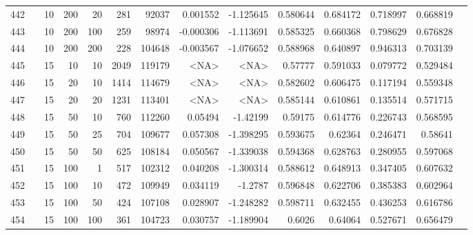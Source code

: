 \begin{longtable}{llrrrrrrrrrrrr}
		442 & &           10 &               200 &           20 &          281 &      92037 &  0.001552 & -1.125645 &  0.580644 &    0.684172 &       0.718997 &  0.668819 \\
		443 & &           10 &               200 &          100 &          259 &      98974 & -0.000306 & -1.113691 &  0.585325 &    0.660368 &       0.798629 &  0.676828 \\
		444 & &           10 &               200 &          200 &          228 &     104648 & -0.003567 & -1.076652 &  0.588968 &    0.640897 &       0.946313 &  0.703139 \\
		445 & &           15 &                10 &           10 &           2049 &     119179 &      <NA> &      <NA> &   0.57777 &    0.591033 &       0.079772 &  0.529484 \\
		446 & &           15 &                20 &           10 &           1414 &     114679 &      <NA> &      <NA> &  0.582602 &    0.606475 &       0.117194 &  0.559348 \\
		447 & &           15 &                20 &           20 &           1231 &     113401 &      <NA> &      <NA> &  0.585144 &    0.610861 &       0.135514 &  0.571715 \\
		448 & &           15 &                50 &           10 &          760 &     112260 &   0.05494 &  -1.42199 &   0.59175 &    0.614776 &       0.226743 &  0.568595 \\
		449 & &           15 &                50 &           25 &          704 &     109677 &  0.057308 & -1.398295 &  0.593675 &     0.62364 &       0.246471 &   0.58641 \\
		450 & &           15 &                50 &           50 &          625 &     108184 &  0.050567 & -1.339038 &  0.594368 &    0.628763 &       0.280955 &  0.597068 \\
		451 & &           15 &               100 &            1 &          517 &     102312 &  0.040208 & -1.300314 &  0.588612 &    0.648913 &       0.347405 &  0.607632 \\
		452 & &           15 &               100 &           10 &          472 &     109949 &  0.034119 &   -1.2787 &  0.596848 &    0.622706 &       0.385383 &  0.602964 \\
		453 & &           15 &               100 &           50 &          424 &     107108 &  0.028907 & -1.248282 &  0.598711 &    0.632455 &       0.436253 &  0.616786 \\
		454 & &           15 &               100 &          100 &          361 &     104723 &  0.030757 & -1.189904 &    0.6026 &     0.64064 &       0.527671 &  0.656479 \\

\end{longtable}
